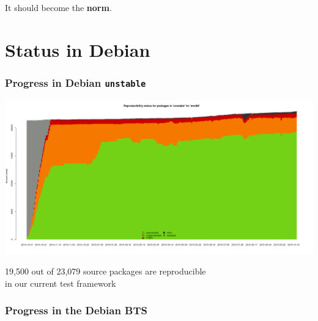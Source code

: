 \documentclass[14pt]{beamer}
\begin{document}
\begin{frame}[plain]
\begin{center}
 \Huge{It should become the \textbf{norm}.}

\end{center}
\end{frame}

\section{Status in Debian}

\begin{frame}[plain]
 \frametitle{Progress in Debian \texttt{unstable}}
 \begin{center}
  \includegraphics[height=0.5\paperheight]{images/stats_pkg_state.png}

  \small{19,500 out of 23,079 source packages are reproducible \\
    in our current test framework}
  \vfill
 \end{center}
\end{frame}


\begin{frame}[plain]
 \frametitle{Progress in the Debian BTS}
\end{frame}
\end{document}
